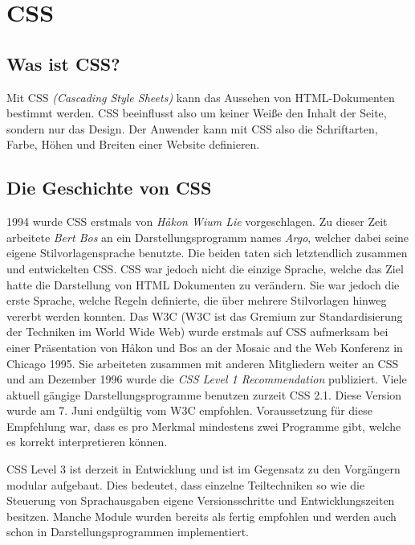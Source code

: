 \section{CSS}
\label{css}

\subsection{Was ist CSS?}
Mit CSS \textit{(Cascading Style Sheets)} kann das Aussehen von HTML-Dokumenten bestimmt werden. 
CSS beeinflusst also um keiner Weiße den Inhalt der Seite, sondern nur das Design. Der Anwender 
kann mit CSS also die Schriftarten, Farbe, Höhen und Breiten einer Website definieren.

\subsection{Die Geschichte von CSS}
1994 wurde CSS erstmals von \textit{Håkon Wium Lie} vorgeschlagen. Zu dieser Zeit arbeitete
\textit{Bert Bos} an ein Darstellungsprogramm names \textit{Argo}, welcher dabei seine eigene 
Stilvorlagensprache benutzte. Die beiden taten sich letztendlich zusammen und entwickelten CSS. 
CSS war jedoch nicht die einzige Sprache, welche das Ziel hatte die Darstellung von HTML Dokumenten zu 
verändern. Sie war jedoch die erste Sprache, welche Regeln definierte, die über mehrere Stilvorlagen 
hinweg vererbt werden konnten. Das W3C (W3C ist das Gremium zur Standardisierung der Techniken im 
World Wide Web) wurde erstmals auf CSS aufmerksam bei einer Präsentation von Håkon und Bos an der 
\glqq Mosaic and the Web\grqq{} Konferenz in Chicago 1995. Sie arbeiteten zusammen mit anderen 
Mitgliedern weiter an CSS und am Dezember 1996 wurde die \textit{CSS Level 1 Recommendation} 
publiziert. Viele aktuell gängige Darstellungsprogramme benutzen zurzeit CSS 2.1. Diese Version wurde am 
7. Juni endgültig vom W3C empfohlen. Voraussetzung für diese Empfehlung war, dass es 
pro Merkmal mindestens zwei Programme gibt, welche es korrekt interpretieren können.


CSS Level 3 ist derzeit in Entwicklung und ist im Gegensatz zu den Vorgängern modular aufgebaut. 
Dies bedeutet, dass einzelne Teiltechniken so wie die Steuerung von Sprachausgaben eigene
Versionsschritte und Entwicklungszeiten besitzen. Manche Module wurden bereits als fertig empfohlen und werden auch 
schon in Darstellungsprogrammen implementiert.
~\cite{CSS}